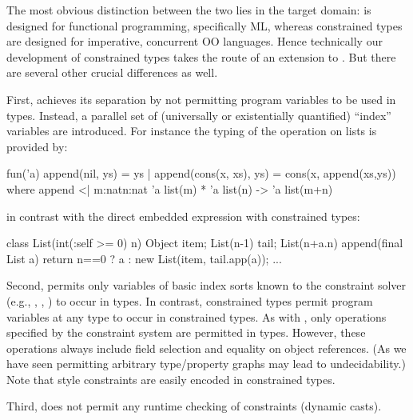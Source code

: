 The most obvious distinction between the two lies in the target
domain: \DML{} is designed for functional programming, specifically
ML, whereas constrained types are designed for imperative, concurrent
OO languages. Hence technically our development of constrained types
takes the route of an extension to \FJ. But there are several other
crucial differences as well.

  {\footnotesize\lstset{language=ML,basicstyle=\tt,tabsize=4,columns=fullflexible,captionpos=b,xleftmargin=1em,xrightmargin=1em,keywordstyle=,keepspaces}}
  {}

First, \DML{} achieves its separation by not permitting program
variables to be used in types. Instead, a parallel set of (universally
or existentially quantified) ``index'' variables are
introduced. For instance the typing of the  operation on
lists is provided by:
\begin{displayml}
fun('a)
  append(nil, ys) = ys
| append(cons(x, xs), ys) = cons(x, append(xs,ys))
where append <| {m:nat}{n:nat} 
              'a list(m) * 'a list(n) -> 'a list(m+n)  
\end{displayml}
\noindent in contrast with the direct embedded expression with constrained types:
\begin{displayxten}
class List(int(:self >= 0) n) {
   Object item;
   List(n-1) tail;
   List(n+a.n) append(final List a) { 
     return n==0 ? a : new List(item, tail.app(a)); }
   ...
}
\end{displayxten}

Second, \DML{} permits only variables of basic index sorts known to
the constraint solver (e.g., , , ) to
occur in types. In contrast, constrained types permit program
variables at any type to occur in constrained types. As with \DML,
only operations specified by the constraint system are permitted in
types. However, these operations always include field selection and
equality on object references.  (As we have seen permitting arbitrary
type/property graphs may lead to undecidability.) Note that \DML{}
style constraints are easily encoded in constrained types.

Third, \DML{} does not permit any runtime checking of constraints
(dynamic casts).
